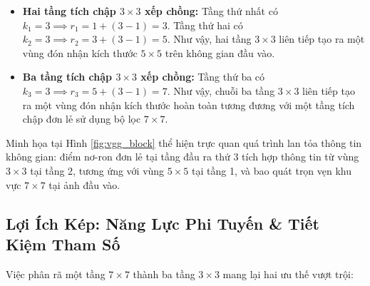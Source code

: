\documentclass[12pt,a4paper]{report}
\begin{document}
\begin{itemize}[leftmargin=*]
    \item \textbf{Hai tầng tích chập $3 \times 3$ xếp chồng:}
    Tầng thứ nhất có $k_1 = 3 \implies r_1 = 1 + (3 - 1) = 3$. Tầng thứ hai có $k_2 = 3 \implies r_2 = 3 + (3 - 1) = 5$. Như vậy, hai tầng $3 \times 3$ liên tiếp tạo ra một vùng đón nhận kích thước $5 \times 5$ trên không gian đầu vào.

    \item \textbf{Ba tầng tích chập $3 \times 3$ xếp chồng:}
    Tầng thứ ba có $k_3 = 3 \implies r_3 = 5 + (3 - 1) = 7$. Như vậy, chuỗi ba tầng $3 \times 3$ liên tiếp tạo ra một vùng đón nhận kích thước hoàn toàn tương đương với một tầng tích chập đơn lẻ sử dụng bộ lọc $7 \times 7$.
\end{itemize}

Minh họa tại Hình \ref{fig:vgg_block} thể hiện trực quan quá trình lan tỏa thông tin không gian: điểm nơ-ron đơn lẻ tại tầng đầu ra thứ 3 tích hợp thông tin từ vùng $3 \times 3$ tại tầng 2, tương ứng với vùng $5 \times 5$ tại tầng 1, và bao quát trọn vẹn khu vực $7 \times 7$ tại ảnh đầu vào.

\subsection{Lợi Ích Kép: Năng Lực Phi Tuyến \& Tiết Kiệm Tham Số}
Việc phân rã một tầng $7 \times 7$ thành ba tầng $3 \times 3$ mang lại hai ưu thế vượt trội:
\end{document}
